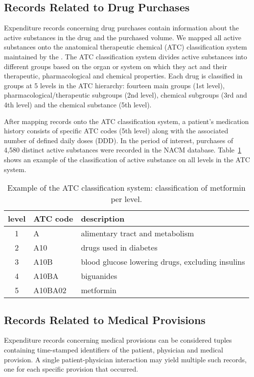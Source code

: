 \documentclass[twoside,11pt]{article}
\begin{document}
\subsection{Records Related to Drug Purchases}
Expenditure records concerning drug purchases contain information about the active substances in the drug and the purchased volume. We mapped all active substances onto the anatomical therapeutic chemical (ATC) classification system maintained by the \citet{world1996guidelines}. The ATC classification system divides active substances into different groups based on the organ or system on which they act and their therapeutic, pharmacological and chemical properties. Each drug is classified in groups at 5 levels in the ATC hierarchy: fourteen main groups (1st level), pharmacological/therapeutic subgroups (2nd level), chemical subgroups (3rd and 4th level) and the chemical substance (5th level).

After mapping records onto the ATC classification system, a patient's medication history consists of specific ATC codes (5th level) along with the associated number of defined daily doses (DDD). In the period of interest, purchases of 4,580 distinct active substances were recorded in the NACM database. Table~\ref{table:atc-example} shows an example of the classification of active substance on all levels in the ATC system.

\begin{table}[!h]
\centering
\begin{tabular}{cll}
\toprule
level	 & ATC code	 & description \\
\midrule
1 	& A	& alimentary tract and metabolism \\
2	& A10	& drugs used in diabetes \\
3	& A10B	& blood glucose lowering drugs, excluding insulins \\
4	& A10BA & biguanides \\
5	& A10BA02 & metformin \\
\bottomrule
\end{tabular}
\caption{Example of the ATC classification system: classification of metformin per level.}
\label{table:atc-example}
\end{table}

\subsection{Records Related to Medical Provisions}
Expenditure records concerning medical provisions can be considered tuples containing time-stamped identifiers of the patient, physician and medical provision. A single patient-physician interaction may yield multiple such records, one for each specific provision that occurred.
\end{document}
